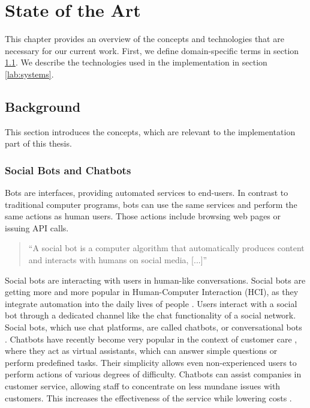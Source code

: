 \chapter{State of the Art}
This chapter provides an overview of the concepts and technologies that are necessary for our current work. First, we define domain-specific terms in section \ref{lab:background}. We describe the technologies used in the implementation in section \ref{lab:systems}.

\section{Background} \label{lab:background}

This section introduces the concepts, which are relevant to the implementation part of this thesis.

\subsection{Social Bots and Chatbots}\label{sec:chatbots}
Bots are interfaces, providing automated services to end-users.
In contrast to traditional computer programs, bots can use the same services and perform the same actions as human users. Those actions include browsing web pages or issuing API calls.
\begin{quote}
    ``A social bot is a computer algorithm that automatically produces content and interacts with humans on social media, [...]'' \cite{FVD*16b}
\end{quote}
Social bots are interacting with users in human-like conversations.
Social bots are getting more and more popular in Human-Computer Interaction (HCI), as they integrate automation into the daily lives of people \cite{BFPN17}. Users interact with a social bot through a dedicated channel like the chat functionality of a social network.
Social bots, which use chat platforms, are called chatbots, or conversational bots \cite{WWX*16,AAA17}.
Chatbots have recently become very popular in the context of customer care \cite{CHW*17,FVD*16b}, where they act as virtual assistants, which can answer simple questions \cite{CaWh14} or perform predefined tasks. 
Their simplicity allows even non-experienced users to perform actions of various degrees of difficulty. 
Chatbots can assist companies in customer service, allowing staff to concentrate on less mundane issues with customers. This increases the effectiveness of the service while lowering costs \cite{AAA17}.

